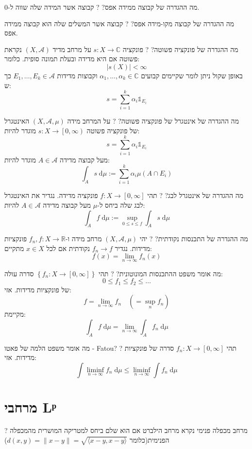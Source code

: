 \documentclass{tstextbook}
\begin{document}
מה ההגדרה של קבוצה ממידה אפס?
?
קבוצה אשר המידה שלה שווה ל-0.

מה ההגדרה של קבוצה מקו-מידה אפס?
?
קבוצה אשר המשלים שלה הוא קבוצה ממידה אפס.

מה ההגדרה של פונקציה פשוטה?
?
פונקציה \(s:X\to \mathbb{C}\) על מרחב מדיד \(\left( X,\mathcal{A} \right)\) נקראת פשוטה אם היא מדידה ובעלת תמונה סופית. כלומר:
$$\lvert s(X) \rvert <\infty$$
באופן שקול ניתן לומר שקיימים קבועים \(\alpha_{1},\dots,\alpha_{k}\in \mathbb{C}\) וקבוצות מדידות \(E_{1},\dots,E_{k}\in \mathcal{A}\) כך ש:
$$s=\sum_{i=1}^{k}\alpha_{i}\mathbb{1} _{E_{i}}$$

מה ההגדרה של אינטגרל של פונקציה פשוטה?
?
על המרחב מידה \(\left( X,\mathcal{A},\mu \right)\) האינטגרל של פונקציה פשוטה \(s:X\to \left[ 0,\infty \right)\) מוגדר להיות:
$$s=\sum_{i=1}^{k} \alpha_{i}\mathbb{1} _{E_{i}}$$
מעל קבוצה מדידה \(A\in \mathcal{A}\) מוגדר להיות:
$$\int_{A} s\;\mathrm{d}\mu:= \sum_{i=1}^{k} \alpha_{i}\mu\left( A\cap E_{i} \right)$$

מה ההגדרה של אינטגרל לבג?
?
תהי \(f:X\to \left[ 0,\infty \right]\) פונקציה מדידה. נגדיר את האינטגרל לבג שלה ביחס ל-\(\mu\) מעל קבוצה מדידה \(A \in \mathcal{ A}\) להיות:
$$\int _{A}f \;\mathrm{d} \mu := \sup _{0\leq s \leq f} \int _{A}s \;\mathrm{d} \mu $$

מה ההגדרה של התכנסות נקודתית?
?
יהי \(\left( X,\mathcal{A},\mu \right)\) מרחב מידה ו-\(f_{n},f:X\to \mathbb{R}\) פונקציות מדידות. נגדיר \(f_{n}\to f\) נקודתית אם לכל \(x \in X\) מתקיים:
$$f(x)=\lim_{ n \to \infty } f_{n}(x)$$

מה אומר משפט ההתכנסות המונוטונית?
?
תהי \(\left\{  f_{n}:X\to \left[ 0,\infty \right]  \right\}\) סדרה עולה:
$$0\leq f_{1} \leq f_{2} \leq \dots$$
של פונקציות מדידות. אזי:
$$f=\lim_{ n \to \infty } f_{n}\quad \left( =\sup _{n}f_{n} \right)$$
מקיימת:
$$\int_{A}f \;\mathrm{d}\mu = \lim_{ n \to \infty } \int_{A}f_{n}\;\mathrm{d}\mu$$

מה אומר משפט הלמה של פאטו - Fatou?
?
תהי \(f_{n}:X\to \left[ 0,\infty \right]\) סדרה של פונקציות מדידות. אזי:
$$\int \liminf_{ n \to \infty }  f_{n}\;\mathrm{d} \mu \leq \liminf_{ n \to \infty } \int f_{n} \;\mathrm{d} \mu   $$

\section{מרחבי Lᵖ}

?
מרחב מכפלה פנימי נקרא מרחב הילברט אם הוא שלם ביחס למטריקה המושרית מהמכפלה הפנימית(כלומר \(d(x,y)=\lVert x-y \rVert=\sqrt{ \langle x-y,x-y \rangle }\))
\end{document}
